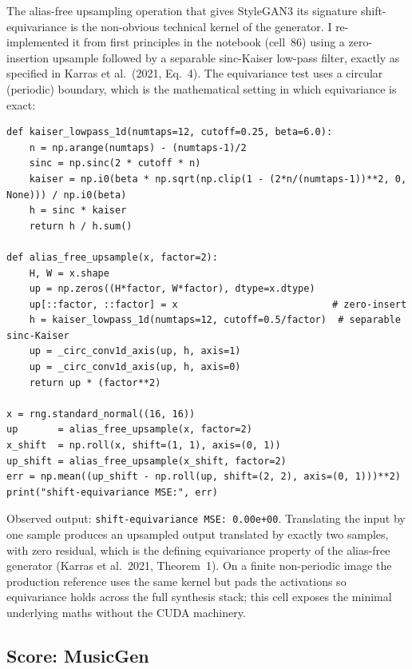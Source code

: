 \documentclass{article}
\begin{document}
The alias-free upsampling operation that gives StyleGAN3 its signature shift-equivariance is the non-obvious technical kernel of the generator. I re-implemented it from first principles in the notebook (cell~86) using a zero-insertion upsample followed by a separable sinc-Kaiser low-pass filter, exactly as specified in Karras et al.\ (2021, Eq.~4). The equivariance test uses a circular (periodic) boundary, which is the mathematical setting in which equivariance is exact:

\begin{lstlisting}[caption={From-scratch alias-free upsample; the circular-boundary shift-equivariance test should yield exactly zero MSE. Library-backed equivalent: the fused \texttt{filtered\_lrelu} CUDA kernels in the NVIDIA StyleGAN3 reference.}]
def kaiser_lowpass_1d(numtaps=12, cutoff=0.25, beta=6.0):
    n = np.arange(numtaps) - (numtaps-1)/2
    sinc = np.sinc(2 * cutoff * n)
    kaiser = np.i0(beta * np.sqrt(np.clip(1 - (2*n/(numtaps-1))**2, 0, None))) / np.i0(beta)
    h = sinc * kaiser
    return h / h.sum()

def alias_free_upsample(x, factor=2):
    H, W = x.shape
    up = np.zeros((H*factor, W*factor), dtype=x.dtype)
    up[::factor, ::factor] = x                           # zero-insert
    h = kaiser_lowpass_1d(numtaps=12, cutoff=0.5/factor)  # separable sinc-Kaiser
    up = _circ_conv1d_axis(up, h, axis=1)
    up = _circ_conv1d_axis(up, h, axis=0)
    return up * (factor**2)

x = rng.standard_normal((16, 16))
up       = alias_free_upsample(x, factor=2)
x_shift  = np.roll(x, shift=(1, 1), axis=(0, 1))
up_shift = alias_free_upsample(x_shift, factor=2)
err = np.mean((up_shift - np.roll(up, shift=(2, 2), axis=(0, 1)))**2)
print("shift-equivariance MSE:", err)
\end{lstlisting}

\noindent Observed output: \texttt{shift-equivariance MSE: 0.00e+00}. Translating the input by one sample produces an upsampled output translated by exactly two samples, with zero residual, which is the defining equivariance property of the alias-free generator (Karras et al.\ 2021, Theorem~1). On a finite non-periodic image the production reference uses the same kernel but pads the activations so equivariance holds across the full synthesis stack; this cell exposes the minimal underlying maths without the CUDA machinery.

\subsection{Score: MusicGen}
\end{document}

